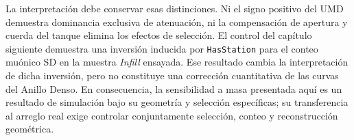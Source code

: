 La interpretación debe conservar esas distinciones. Ni el signo positivo del UMD demuestra dominancia exclusiva de atenuación, ni la compensación de apertura y cuerda del tanque elimina los efectos de selección. El control del capítulo siguiente demuestra una inversión inducida por \texttt{HasStation} para el conteo muónico SD en la muestra \textit{Infill} ensayada. Ese resultado cambia la interpretación de dicha inversión, pero no constituye una corrección cuantitativa de las curvas del Anillo Denso. En consecuencia, la sensibilidad a masa presentada aquí es un resultado de simulación bajo su geometría y selección específicas; su transferencia al arreglo real exige controlar conjuntamente selección, conteo y reconstrucción geométrica.

\newpage
